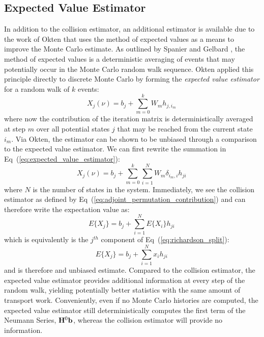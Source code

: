 \subsection{Expected Value Estimator}
\label{subsec:expected_value_estimator}
In addition to the collision estimator, an additional estimator is
available due to the work of Okten \citep{okten_solving_2005} that
uses the method of expected values as a means to improve the Monte
Carlo estimate. As outlined by Spanier and Gelbard
\citep{spanier_monte_1969}, the method of expected values is a
deterministic averaging of events that may potentially occur in the
Monte Carlo random walk sequence. Okten applied this principle
directly to discrete Monte Carlo by forming the \textit{expected value
  estimator} for a random walk of $k$ events:
\begin{equation}
  X_{j}(\nu) = b_j + \sum_{m=0}^k W_m h_{j,i_m}\,
  \label{eq:expected_value_estimator}
\end{equation}
where now the contribution of the iteration matrix is
deterministically averaged at step $m$ over all potential states $j$
that may be reached from the current state $i_m$. Via Okten, the
estimator can be shown to be unbiased through a comparison to
the expected value estimator. We can first rewrite the summation in
Eq~(\ref{eq:expected_value_estimator}):
\begin{equation}
  X_{j}(\nu) = b_j + \sum_{m=0}^k \sum_{i=1}^N W_m
  \delta_{i_m,i} h_{ji}\,
  \label{eq:unbiased_eval_1}
\end{equation}
where $N$ is the number of states in the system. Immediately, we see
the collision estimator as defined by
Eq~(\ref{eq:adjoint_permutation_contribution}) and can therefore write
the expectation value as:
\begin{equation}
  E\{X_{j}\} = b_j + \sum_{i=1}^N E\{X_{i}\} h_{ji}\,
  \label{eq:unbiased_eval_2}
\end{equation}
which is equivalently is the $j^{th}$ component of
Eq~(\ref{eq:richardson_split}):
\begin{equation}
  E\{X_{j}\} = b_j + \sum_{i=1}^N x_{i} h_{ji}\,
  \label{eq:unbiased_eval_2}
\end{equation}
and is therefore and unbiased estimate. Compared to the collision
estimator, the expected value estimator provides additional
information at every step of the random walk, yielding potentially
better statistics with the same amount of transport
work. Conveniently, even if no Monte Carlo histories are computed, the
expected value estimator still deterministically computes the first
term of the Neumann Series, $\mathbf{H}^0\mathbf{b}$, whereas the collision
estimator will provide no information.

